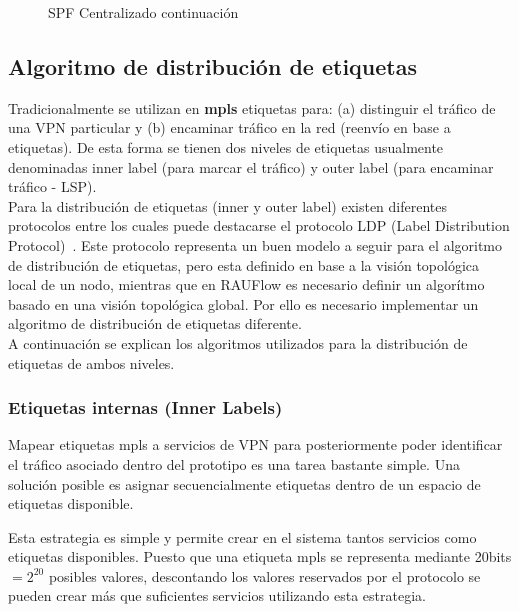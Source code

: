\begin{figure}[ht!]
\begin{algorithm}[H]
{  
 \vspace{1cm} 
 }
 
\end{algorithm}
\caption[]{SPF Centralizado continuaci\'on}
\end{figure}

\newpage
\subsection{Algoritmo de distribución de etiquetas}
\label{section5.5.4}

Tradicionalmente se utilizan en \textbf{mpls} etiquetas para: (a) distinguir el tr\'afico de una VPN particular y (b) encaminar tr\'afico en la red (reenvío en base a etiquetas). De esta forma se tienen dos niveles de etiquetas usualmente denominadas inner label (para marcar el tr\'afico) y outer label (para encaminar tr\'afico - LSP).\\

Para la distribución de etiquetas (inner y outer label) existen diferentes protocolos entre los cuales puede destacarse el protocolo LDP (Label Distribution Protocol)~\citep{LDPRFC}. Este protocolo representa un buen modelo a seguir para el algoritmo de distribución de etiquetas, pero esta definido en base a la visión topol\'ogica local de un nodo, mientras que en RAUFlow es necesario definir un algor\'itmo basado en una visi\'on topol\'ogica global. Por ello es necesario implementar un algoritmo de distribución de etiquetas diferente.\\

A continuaci\'on se explican los algoritmos utilizados para la distribución de etiquetas de ambos niveles.

\subsubsection{Etiquetas internas (Inner Labels)}
Mapear etiquetas mpls a servicios de VPN para posteriormente poder identificar el tr\'afico asociado dentro del prototipo es una tarea bastante simple. Una soluci\'on posible es asignar secuencialmente etiquetas dentro de un espacio de etiquetas disponible.

Esta estrategia es simple y permite crear en el sistema tantos servicios como etiquetas disponibles. Puesto que una etiqueta mpls se representa mediante 20bits $= 2^{20}$ posibles valores, descontando los  valores reservados por el protocolo se pueden crear m\'as que suficientes servicios utilizando esta estrategia.\\

